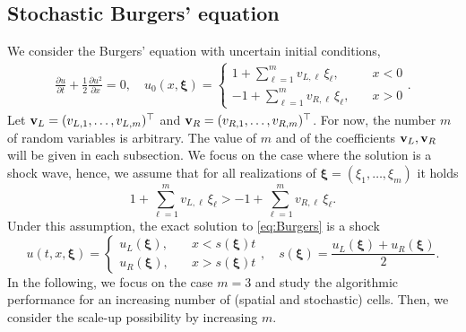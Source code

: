 \documentclass{article}
\newcommand{\bfxi}{ {\bm \xi} }
\newcommand{\bfv}{ {\bf v} }
\begin{document}
\subsection{Stochastic Burgers' equation}
We consider the Burgers' equation with uncertain initial conditions,
\begin{align}
    \frac{\partial u}{\partial t} + \frac{1}{2}\frac{\partial u^2}{\partial x} = 0, \label{eq:Burgers}
    \quad
    u_0(x,\bfxi) = \begin{cases}
         1 + \sum_{\ell=1}^m v_{L,\ell} \, \xi_\ell, & \quad x < 0
        \\
        - 1 + \sum_{\ell=1}^m v_{R,\ell} \, \xi_\ell, & \quad x > 0
    \end{cases}  %
    .
\end{align}
Let $\bfv_L=(v_{L,1},\dots,v_{L,m})^\top$ and $\bfv_R=(v_{R,1},\dots,v_{R,m})^\top$.
For now, the number $m$ of random variables is arbitrary. The value of $m$ and of the coefficients $\bfv_L, \bfv_R$ will be given in each subsection. 
We focus on the case where the solution is a shock wave, hence, we assume that for all realizations of $\bfxi=(\xi_1,\dots,\xi_m)$ it holds 
\begin{equation} 
    1 + \sum_{\ell=1}^m v_{L,\ell} \, \xi_\ell > - 1 + \sum_{\ell=1}^m v_{R,\ell} \, \xi_\ell. 
\end{equation}
Under this assumption, the exact solution to \eqref{eq:Burgers} is a shock
\begin{equation}
    u(t,x,\bfxi) = \begin{cases}
        u_L(\bfxi),  & \quad x < s(\bfxi)t
        \\
        u_R(\bfxi), & \quad x > s(\bfxi)t
    \end{cases}
    ,\quad s(\bfxi) = \frac{u_L(\bfxi)+u_R(\bfxi)}{2}.
\end{equation}
%
In the following, we focus on the case $m=3$ and study the algorithmic performance for an increasing number of (spatial and stochastic) cells. 
Then, we consider the scale-up possibility by increasing $m$. 
\end{document}
